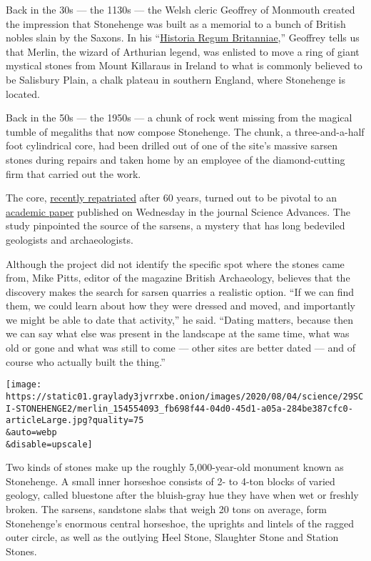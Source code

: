 Back in the 30s --- the 1130s --- the Welsh cleric Geoffrey of Monmouth
created the impression that Stonehenge was built as a memorial to a
bunch of British nobles slain by the Saxons. In his
``\href{https://en.wikipedia.org/wiki/Historia_Regum_Britanniae}{Historia
Regum Britanniae},'' Geoffrey tells us that Merlin, the wizard of
Arthurian legend, was enlisted to move a ring of giant mystical stones
from Mount Killaraus in Ireland to what is commonly believed to be
Salisbury Plain, a chalk plateau in southern England, where Stonehenge
is located.

Back in the 50s --- the 1950s --- a chunk of rock went missing from the
magical tumble of megaliths that now compose Stonehenge. The chunk, a
three-and-a-half foot cylindrical core, had been drilled out of one of
the site's massive sarsen stones during repairs and taken home by an
employee of the diamond-cutting firm that carried out the work.

The core,
\href{https://www.nytimes3xbfgragh.onion/2019/05/08/world/europe/uk-stonehenge-missing-piece.html}{recently
repatriated} after 60 years, turned out to be pivotal to an
\href{https://advances.sciencemag.org/content/6/31/eabc0133}{academic
paper} published on Wednesday in the journal Science Advances. The study
pinpointed the source of the sarsens, a mystery that has long bedeviled
geologists and archaeologists.

Although the project did not identify the specific spot where the stones
came from, Mike Pitts, editor of the magazine British Archaeology,
believes that the discovery makes the search for sarsen quarries a
realistic option. ``If we can find them, we could learn about how they
were dressed and moved, and importantly we might be able to date that
activity,'' he said. ``Dating matters, because then we can say what else
was present in the landscape at the same time, what was old or gone and
what was still to come --- other sites are better dated --- and of
course who actually built the thing.''

\texttt{[image: https://static01.graylady3jvrrxbe.onion/images/2020/08/04/science/29SCI-STONEHENGE2/merlin\_154554093\_fb698f44-04d0-45d1-a05a-284be387cfc0-articleLarge.jpg?quality=75\\\&auto=webp\\\&disable=upscale]}

Two kinds of stones make up the roughly 5,000-year-old monument known as
Stonehenge. A small inner horseshoe consists of 2- to 4-ton blocks of
varied geology, called bluestone after the bluish-gray hue they have
when wet or freshly broken. The sarsens, sandstone slabs that weigh 20
tons on average, form Stonehenge's enormous central horseshoe, the
uprights and lintels of the ragged outer circle, as well as the outlying
Heel Stone, Slaughter Stone and Station Stones.

